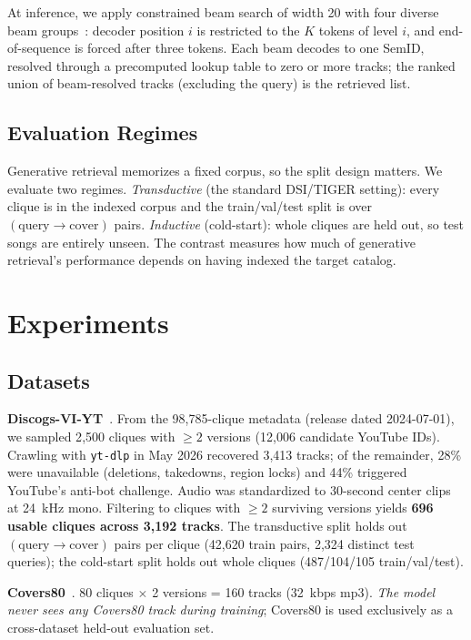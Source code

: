 \documentclass[conference]{IEEEtran}
\begin{document}
At inference, we apply constrained beam search of width 20 with four diverse beam groups~\cite{vijayakumar2018diverse}: decoder position $i$ is restricted to the $K$ tokens of level $i$, and end-of-sequence is forced after three tokens. Each beam decodes to one SemID, resolved through a precomputed lookup table to zero or more tracks; the ranked union of beam-resolved tracks (excluding the query) is the retrieved list.

\subsection{Evaluation Regimes}
Generative retrieval memorizes a fixed corpus, so the split design matters. We evaluate two regimes. \emph{Transductive} (the standard DSI/TIGER setting): every clique is in the indexed corpus and the train/val/test split is over $(\text{query}\rightarrow\text{cover})$ pairs. \emph{Inductive} (cold-start): whole cliques are held out, so test songs are entirely unseen. The contrast measures how much of generative retrieval's performance depends on having indexed the target catalog.

\section{Experiments}

\subsection{Datasets}
\textbf{Discogs-VI-YT}~\cite{araz2024discogsvi}. From the 98{,}785-clique metadata (release dated 2024-07-01), we sampled 2{,}500 cliques with $\geq 2$ versions (12{,}006 candidate YouTube IDs). Crawling with \texttt{yt-dlp} in May 2026 recovered 3{,}413 tracks; of the remainder, 28\% were unavailable (deletions, takedowns, region locks) and 44\% triggered YouTube's anti-bot challenge. Audio was standardized to 30-second center clips at 24~kHz mono. Filtering to cliques with $\geq 2$ surviving versions yields \textbf{696 usable cliques across 3{,}192 tracks}. The transductive split holds out $(\text{query}\rightarrow\text{cover})$ pairs per clique (42{,}620 train pairs, 2{,}324 distinct test queries); the cold-start split holds out whole cliques (487/104/105 train/val/test).

\textbf{Covers80}~\cite{ellis2007covers80}. 80 cliques $\times$ 2 versions = 160 tracks (32~kbps mp3). \textit{The model never sees any Covers80 track during training}; Covers80 is used exclusively as a cross-dataset held-out evaluation set.
\end{document}
